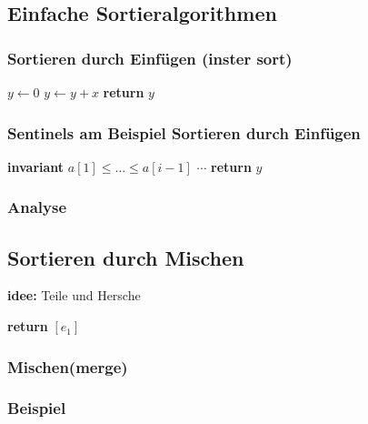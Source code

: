 \subsection{Einfache Sortieralgorithmen}
\subsubsection*{Sortieren durch Einfügen (inster sort)}
\begin{algorithmic}
      \State $y \gets 0$
          \State $y \gets y + x$
        \EndIf
      \EndFor
      \State \textbf{return} $y$
    \EndProcedure
  \end{algorithmic}

  \subsubsection*{Sentinels am Beispiel Sortieren durch Einfügen}
  
  \begin{algorithmic}
        \State \textbf{invariant} $a[1] \leq \ldots \leq a[i-1]$
        $\cdots$
      \EndFor
      \State \textbf{return} $y$
    \EndProcedure
  \end{algorithmic}

  \subsubsection*{Analyse}

  \subsection{Sortieren durch Mischen}
  \textbf{idee:} Teile und Hersche \\

  \begin{algorithmic}
    \State \textbf{return} $[e_1]$
    \EndIf
    \EndProcedure
  \end{algorithmic}

  \subsubsection*{Mischen(merge)}
  \subsubsection*{Beispiel}
